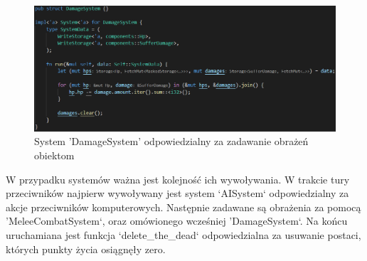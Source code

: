 \documentclass[12pt,twoside]{article}
\begin{document}
\FloatBarrier
\begin{figure}[ht]
	\centering
	\includegraphics[width=16cm]{images/code/system_damage.png}
	\caption{System 'DamageSystem' odpowiedzialny za zadawanie obrażeń obiektom}
	\label{code:system_damage}
\end{figure}
\FloatBarrier

W przypadku systemów ważna jest kolejność ich wywoływania. W trakcie tury przeciwników najpierw wywoływany jest system `AISystem` odpowiedzialny za akcje przeciwników komputerowych. Następnie zadawane są obrażenia za pomocą 'MeleeCombatSystem`, oraz omówionego wcześniej 'DamageSystem`. Na końcu uruchamiana jest funkcja `delete\_the\_dead` odpowiedzialna za usuwanie postaci, których punkty życia osiągnęły zero.
\end{document}
